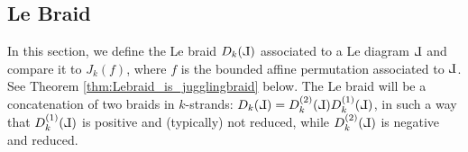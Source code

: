 \documentclass[10pt]{amsart}
\theoremstyle{plain}
\theoremstyle{definition}
\theoremstyle{remark}
\numberwithin{equation}{section}
\DeclareMathOperator{\inv}{inv}
\def\Le{\reflectbox{$\mathrm{L}$}}
\begin{document}

\subsection{Le Braid}\label{ssec:LeBraid} In this section, we define the Le braid $D_k(\Le)$ associated to a Le diagram $\Le$ and compare it to $J_k(f)$, where $f$ is the bounded affine permutation associated to $\Le$. See Theorem \ref{thm:Lebraid_is_jugglingbraid} below. The Le braid will be a concatenation of two braids in $k$-strands: $D_{k}(\Le) = D_{k}^{(2)}(\Le)D_k^{(1)}(\Le)$, in such a way that $D_{k}^{(1)}(\Le)$ is positive and (typically) not reduced, while $D_{k}^{(2)}(\Le)$ is negative and reduced. 
\end{document}
